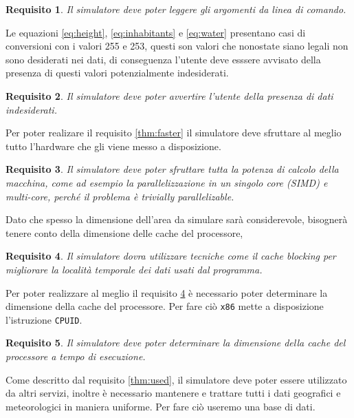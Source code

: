 \documentclass[draft]{article}
\newcommand{\eng}[1]{\foreignlanguage{english}{#1}} %
\newtheorem{requirement}{Requisito}
\begin{document}
\begin{requirement}
Il simulatore deve poter leggere gli argomenti da linea di comando.
\end{requirement}

Le equazioni \ref{eq:height}, \ref{eq:inhabitants} e \ref{eq:water} presentano
casi di conversioni con i valori 255 e 253, questi son valori che nonostate
siano legali non sono desiderati nei dati, di conseguenza l'utente deve esssere
avvisato della presenza di questi valori potenzialmente indesiderati.

\begin{requirement}
Il simulatore deve poter avvertire l'utente della presenza di dati indesiderati.
\end{requirement}

Per poter realizare il requisito \ref{thm:faster} il simulatore deve sfruttare
al meglio tutto l'\eng{hardware} che gli viene messo a disposizione.

\begin{requirement}\label{thm:multicore}
Il simulatore deve poter sfruttare tutta la potenza di calcolo della macchina,
come ad esempio la parallelizzazione in un singolo \eng{core} (SIMD) e
\eng{multi-core}, perché il problema è \eng{trivially parallelizable}.
\end{requirement}

Dato che spesso la dimensione dell'area da simulare sarà considerevole,
bisognerà tenere conto della dimensione delle \eng{cache} del processore,

\begin{requirement}\label{thm:blocking}
Il simulatore dovra utilizzare tecniche come il \eng{cache blocking} per
migliorare la località temporale dei dati usati dal programma.
\end{requirement}

Per poter realizzare al meglio il requisito \ref{thm:blocking} è necessario
poter determinare la dimensione della \eng{cache} del processore. Per fare ciò
\texttt{x86} mette a disposizione l'istruzione \texttt{CPUID}.

\begin{requirement}
Il simulatore deve poter determinare la dimensione della \eng{cache} del
processore a tempo di esecuzione.
\end{requirement}

Come descritto dal requisito \ref{thm:used}, il simulatore deve poter essere
utilizzato da altri servizi, inoltre è necessario mantenere e trattare tutti i
dati geografici e meteorologici in maniera uniforme. Per fare ciò useremo una
base di dati.
\end{document}
